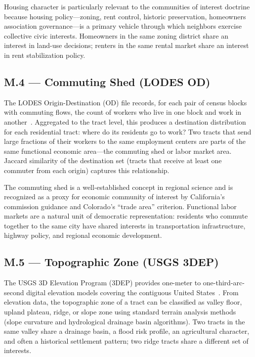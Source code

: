 Housing character is particularly relevant to the communities of interest doctrine
because housing policy---zoning, rent control, historic preservation, homeowners
association governance---is a primary vehicle through which neighbors exercise
collective civic interests.
Homeowners in the same zoning district share an interest in land-use decisions;
renters in the same rental market share an interest in rent stabilization policy.

\subsection{M.4 --- Commuting Shed (LODES OD)}

The LODES Origin-Destination (OD) file records, for each pair of census blocks
with commuting flows, the count of workers who live in one block and work in
another~\citep{lodes2022}.
Aggregated to the tract level, this produces a destination distribution for each
residential tract: where do its residents go to work?
Two tracts that send large fractions of their workers to the same employment centers
are parts of the same functional economic area---the commuting shed or labor market area.
Jaccard similarity of the destination set (tracts that receive at least one commuter
from each origin) captures this relationship.

The commuting shed is a well-established concept in regional science and is recognized
as a proxy for economic community of interest by California's commission guidance
and Colorado's ``trade area'' criterion.
Functional labor markets are a natural unit of democratic representation: residents
who commute together to the same city have shared interests in transportation
infrastructure, highway policy, and regional economic development.

\subsection{M.5 --- Topographic Zone (USGS 3DEP)}

The USGS 3D Elevation Program (3DEP) provides one-meter to one-third-arc-second
digital elevation models covering the contiguous United States~\citep{usgs3dep}.
From elevation data, the topographic zone of a tract can be classified as valley
floor, upland plateau, ridge, or slope zone using standard terrain analysis methods
(slope curvature and hydrological drainage basin algorithms).
Two tracts in the same valley share a drainage basin, a flood risk profile, an
agricultural character, and often a historical settlement pattern; two ridge tracts
share a different set of interests.

